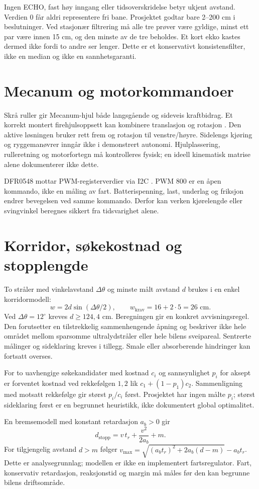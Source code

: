 Ingen ECHO, fast høy inngang eller tidsoverskridelse betyr ukjent avstand.
Verdien 0 får aldri representere fri bane. Prosjektet godtar bare 2--200 cm
i beslutninger. Ved stasjonær filtrering må alle tre prøver være gyldige,
minst ett par være innen 15 cm, og den minste av de tre beholdes.
Et kort ekko kastes dermed ikke fordi to andre ser lenger. Dette er et
konservativt konsistensfilter, ikke en median og ikke en sannhetsgaranti.

\section{Mecanum og motorkommandoer}
Skrå ruller gir Mecanum-hjul både langsgående og sideveis kraftbidrag.
Et korrekt montert firehjulsoppsett kan kombinere translasjon og rotasjon
\cite{mecanum}. Den aktive løsningen bruker rett frem og rotasjon til
venstre/høyre. Sidelengs kjøring og ryggemanøvrer inngår ikke i demonstrert
autonomi. Hjulplassering, rulleretning og motorfortegn må kontrolleres
fysisk; en ideell kinematisk matrise alene dokumenterer ikke dette.

DFR0548 mottar PWM-registerverdier via I2C \cite{dfr0548}. PWM 800 er en
åpen kommando, ikke en måling av fart. Batterispenning, last, underlag og
friksjon endrer bevegelsen ved samme kommando. Derfor kan verken
kjørelengde eller svingvinkel beregnes sikkert fra tidsvarighet alene.

\section{Korridor, søkekostnad og stopplengde}
To stråler med vinkelavstand $\Delta\theta$ og minste målt avstand $d$
brukes i en enkel korridormodell:
\begin{equation}
 w=2d\sin(\Delta\theta/2),\qquad
 w_{\mathrm{krav}}=16+2\cdot5=26\text{ cm}.
\end{equation}
Ved $\Delta\theta=12^\circ$ kreves $d\ge124{,}4$ cm. Beregningen gir en
konkret avvisningsregel. Den forutsetter en tilstrekkelig sammenhengende
åpning og beskriver ikke hele området mellom sparsomme ultralydstråler
eller hele bilens sveipareal. Sentrerte målinger og sideklaring kreves i
tillegg. Smale eller absorberende hindringer kan fortsatt overses.

For to uavhengige søkekandidater med kostnad $c_i$ og sannsynlighet $p_i$
for aksept er forventet kostnad ved rekkefølgen $1,2$ lik
$c_1+(1-p_1)c_2$. Sammenligning med motsatt rekkefølge gir størst
$p_i/c_i$ først. Prosjektet har ingen målte $p_i$; størst sideklaring først
er en begrunnet heuristikk, ikke dokumentert global optimalitet.

En bremsemodell med konstant retardasjon $a_b>0$ gir
\begin{equation}\label{eq:stop}
 d_{\mathrm{stopp}}=v\,t_r+\frac{v^2}{2a_b}+m.
\end{equation}
For tilgjengelig avstand $d>m$ følger
$v_{\max}=\sqrt{(a_b t_r)^2+2a_b(d-m)}-a_b t_r$.
Dette er analysegrunnlag; modellen er ikke en implementert fartsregulator.
Fart, konservativ retardasjon, reaksjonstid og margin må måles før
den kan begrunne bilens driftsområde.
